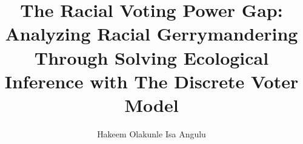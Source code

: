 \title{The Racial Voting Power Gap:\\Analyzing Racial Gerrymandering Through Solving Ecological Inference with The Discrete Voter Model}
\author{Hakeem Olakunle Isa Angulu}




